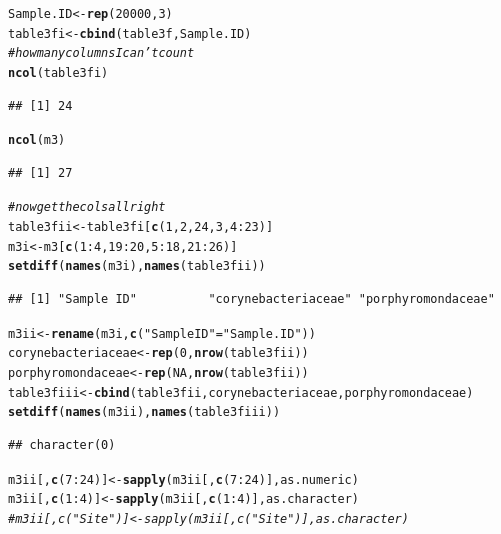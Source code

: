 \documentclass[10pt,handout,english]{beamer}\usepackage[]{graphicx}\usepackage[]{color}
\makeatletter
\newcommand{\hlnum}[1]{\textcolor[rgb]{0.686,0.059,0.569}{#1}}%
\newcommand{\hlstr}[1]{\textcolor[rgb]{0.192,0.494,0.8}{#1}}%
\newcommand{\hlcom}[1]{\textcolor[rgb]{0.678,0.584,0.686}{\textit{#1}}}%
\newcommand{\hlopt}[1]{\textcolor[rgb]{0,0,0}{#1}}%
\newcommand{\hlstd}[1]{\textcolor[rgb]{0.345,0.345,0.345}{#1}}%
\newcommand{\hlkwb}[1]{\textcolor[rgb]{0.69,0.353,0.396}{#1}}%
\newcommand{\hlkwd}[1]{\textcolor[rgb]{0.737,0.353,0.396}{\textbf{#1}}}%
\newenvironment{kframe}{%
 \def\at@end@of@kframe{}%
 \ifinner\ifhmode%
  \def\at@end@of@kframe{\end{minipage}}%
  \begin{minipage}{\columnwidth}%
 \fi\fi%
 \def\FrameCommand##1{\hskip\@totalleftmargin \hskip-\fboxsep
 \colorbox{shadecolor}{##1}\hskip-\fboxsep
     \hskip-\linewidth \hskip-\@totalleftmargin \hskip\columnwidth}%
 \MakeFramed {\advance\hsize-\width
   \@totalleftmargin\z@ \linewidth\hsize
   \@setminipage}}%
 {\par\unskip\endMakeFramed%
 \at@end@of@kframe}
\newenvironment{knitrout}{}{} %
\makeatother
\begin{document}
\begin{frame}[fragile]
\begin{knitrout}
\begin{kframe}
{\ttfamily\noindent\itshape\color{messagecolor}{\#\# Loading required package: plyr}}\begin{alltt}
\hlstd{Sample.ID}\hlkwb{<-}\hlkwd{rep}\hlstd{(}\hlnum{20000}\hlstd{,}\hlnum{3}\hlstd{)}
\hlstd{table3fi}\hlkwb{<-}\hlkwd{cbind}\hlstd{(table3f,Sample.ID)}
\hlcom{#how many columns I can't count}
\hlkwd{ncol}\hlstd{(table3fi)}
\end{alltt}
\begin{verbatim}
## [1] 24
\end{verbatim}
\begin{alltt}
\hlkwd{ncol}\hlstd{(m3)}
\end{alltt}
\begin{verbatim}
## [1] 27
\end{verbatim}
\begin{alltt}
\hlcom{#now get the cols all right}
\hlstd{table3fii}\hlkwb{<-}\hlstd{table3fi[}\hlkwd{c}\hlstd{(}\hlnum{1}\hlstd{,}\hlnum{2}\hlstd{,}\hlnum{24}\hlstd{,}\hlnum{3}\hlstd{,}\hlnum{4}\hlopt{:}\hlnum{23}\hlstd{)]}
\hlstd{m3i}\hlkwb{<-}\hlstd{m3[}\hlkwd{c}\hlstd{(}\hlnum{1}\hlopt{:}\hlnum{4}\hlstd{,}\hlnum{19}\hlopt{:}\hlnum{20}\hlstd{,}\hlnum{5}\hlopt{:}\hlnum{18}\hlstd{,}\hlnum{21}\hlopt{:}\hlnum{26}\hlstd{)]}
\hlkwd{setdiff}\hlstd{(}\hlkwd{names}\hlstd{(m3i),}\hlkwd{names}\hlstd{(table3fii))}
\end{alltt}
\begin{verbatim}
## [1] "Sample ID"          "corynebacteriaceae" "porphyromondaceae"
\end{verbatim}
\begin{alltt}
\hlstd{m3ii}\hlkwb{<-}\hlkwd{rename}\hlstd{(m3i,}\hlkwd{c}\hlstd{(}\hlstr{"Sample ID"}\hlstd{=}\hlstr{"Sample.ID"}\hlstd{))}
\hlstd{corynebacteriaceae}\hlkwb{<-}\hlkwd{rep}\hlstd{(}\hlnum{0}\hlstd{,}\hlkwd{nrow}\hlstd{(table3fii))}
\hlstd{porphyromondaceae}\hlkwb{<-}\hlkwd{rep}\hlstd{(}\hlnum{NA}\hlstd{,}\hlkwd{nrow}\hlstd{(table3fii))}
\hlstd{table3fiii}\hlkwb{<-}\hlkwd{cbind}\hlstd{(table3fii, corynebacteriaceae, porphyromondaceae)}
\hlkwd{setdiff}\hlstd{(}\hlkwd{names}\hlstd{(m3ii),}\hlkwd{names}\hlstd{(table3fiii))}
\end{alltt}
\begin{verbatim}
## character(0)
\end{verbatim}
\begin{alltt}
\hlstd{m3ii[,}\hlkwd{c}\hlstd{(}\hlnum{7}\hlopt{:}\hlnum{24}\hlstd{)]} \hlkwb{<-} \hlkwd{sapply}\hlstd{(m3ii[,}\hlkwd{c}\hlstd{(}\hlnum{7}\hlopt{:}\hlnum{24}\hlstd{)],as.numeric)}
\hlstd{m3ii[,}\hlkwd{c}\hlstd{(}\hlnum{1}\hlopt{:}\hlnum{4}\hlstd{)]} \hlkwb{<-}\hlkwd{sapply}\hlstd{(m3ii[,}\hlkwd{c}\hlstd{(}\hlnum{1}\hlopt{:}\hlnum{4}\hlstd{)],as.character)}
\hlcom{#m3ii[,c("Site")] <-sapply(m3ii[,c("Site")],as.character)}


\end{alltt}
\end{kframe}
\end{knitrout}
\end{frame}
\end{document}
